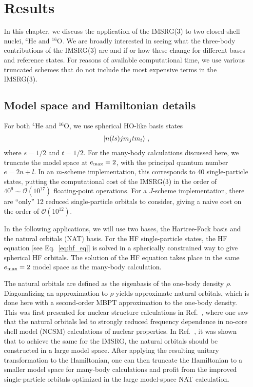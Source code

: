 \chapter{Results}\label{ch:jscheme_results}

In this chapter,
we discuss the application of the IMSRG(3)
to two closed-shell nuclei,
${}^{4}\text{He}$
and
${}^{16}\text{O}$.
We are broadly interested in seeing
what the three-body contributions of the IMSRG(3) are
and if or how these change for different bases and reference states.
For reasons of available computational time,
we use various truncated schemes
that do not include the most expensive terms
in the IMSRG(3).

\section{Model space and Hamiltonian details}

For both
${}^{4}\text{He}$
and
${}^{16}\text{O}$,
we use spherical HO-like basis states
\begin{equation}
    \ket{n (l s) j m_j t m_t}\,,
\end{equation}
where $s=1/2$ and $t=1/2$.
For the many-body calculations discussed here,
we truncate the model space at $e_{\text{max}} = 2$,
with the principal quantum number $e = 2 n + l$.
In an $m$-scheme implementation,
this corresponds to 40 single-particle states,
putting the computational cost of the IMSRG(3)
in the order of $40^9 \sim \mathcal{O}(10^{17})$ floating-point operations.
For a $J$-scheme implementation,
there are ``only'' 12 reduced single-particle orbitals to consider,
giving a naive cost on the order of $\mathcal{O}(10^{12})$.

In the following applications,
we will use two bases,
the Hartree-Fock basis and the natural orbitals (NAT) basis.
For the HF single-particle states,
the HF equation [see Eq.~\eqref{eq:hf_eq}]
is solved in a spherically constrained way
to give spherical HF orbitals.
The solution of the HF equation takes place
in the same $e_{\text{max}}=2$ model space as the many-body calculation.

The natural orbitals are defined as the eigenbasis of
the one-body density $\rho$.
Diagonalizing an approximation to $\rho$
yields approximate natural orbitals,
which is done here with a second-order MBPT
approximation to the one-body density.
This was first presented for nuclear structure calculations
in Ref.~\cite{Tich18natural_orbitals},
where one saw that the natural orbitals
led to strongly reduced frequency dependence
in no-core shell model (NCSM) calculations of nuclear properties.
In Ref.~\cite{Hopp20natural_orbitals},
it was shown that to achieve the same for the IMSRG,
the natural orbitals should be constructed in a large model space.
After applying the resulting unitary transformation to the Hamiltonian,
one can then truncate the Hamiltonian to a smaller model space
for many-body calculations
and profit from the improved single-particle orbitals
optimized in the large model-space NAT calculation.

